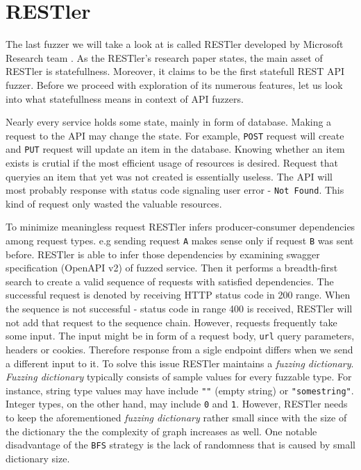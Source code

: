 \section{RESTler}
\label{sec:restler}
The last fuzzer we will take a look at is called RESTler developed by Microsoft Research team \cite{atlidakis2019restler}. As the RESTler's research paper states, the main asset of RESTler is statefullness. Moreover, it claims to be the first statefull REST API fuzzer. Before we proceed with exploration of its numerous features, let us look into what statefullness means in context of API fuzzers.

Nearly every service holds some state, mainly in form of database. Making a request to the API may change the state. For example, \texttt{POST} request will create and \texttt{PUT} request will update an item in the database. Knowing whether an item exists is crutial if the most  efficient usage of resources is desired. Request that queryies an item that yet was not created is essentially useless. The API will most probably response with status code signaling user error - \texttt{Not Found}. This kind of request only wasted the valuable resources.

To minimize meaningless request RESTler infers producer-consumer dependencies among request types. e.g sending request \texttt{A} makes sense only if request \texttt{B} was sent before. RESTler is able to infer those dependencies by examining swagger specification (OpenAPI v2) of fuzzed service. Then it performs a breadth-first search to create a valid sequence of requests with satisfied dependencies. The successful request is denoted by receiving HTTP status code in 200 range. When the sequence is not successful - status code in range 400 is received, RESTler will not add that request to the sequence chain. However, requests frequently take some input. The input might be in form of a request body, \texttt{url} query parameters, headers or cookies. Therefore response from a sigle endpoint differs when we send a different input to it. To solve this issue RESTler maintains a \textit{fuzzing dictionary}. \textit{Fuzzing dictionary} typically consists of sample values for every fuzzable type. For instance, string type values may have include \texttt{""} (empty string) or \texttt{"somestring"}. Integer types, on the other hand, may include \texttt{0} and \texttt{1}. However, RESTler needs to keep the aforementioned \textit{fuzzing dictionary} rather small since with the size of the dictionary the the complexity of graph increases as well. One notable disadvantage of the \texttt{BFS} strategy is the lack of randomness that is caused by small dictionary size.

